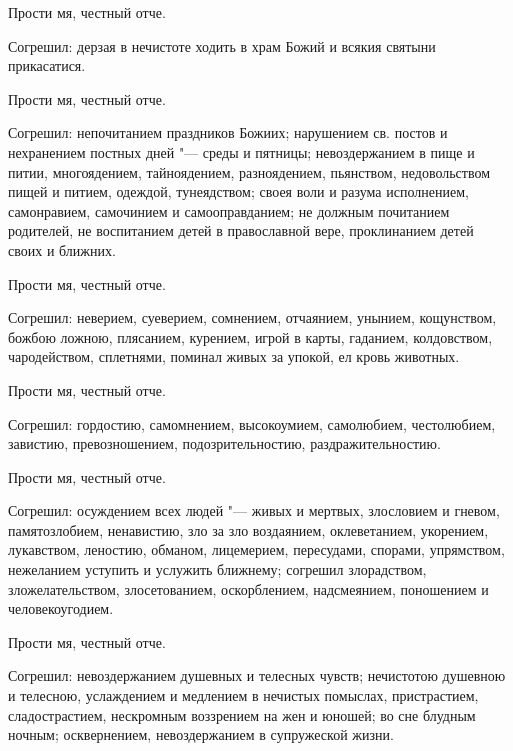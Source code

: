 Прости мя, честный отче. 



Согрешил: дерзая в нечистоте ходить в храм Божий и всякия святыни прикасатися. 



Прости мя, честный отче. 



Согрешил: непочитанием праздников Божиих; нарушением св. постов и нехранением постных дней "--- среды и пятницы; невоздержанием в пище и питии, многоядением, тайноядением, разноядением, пьянством, недовольством пищей и питием, одеждой, тунеядством; своея воли и разума исполнением, самонравием, самочинием и самооправданием; не должным почитанием родителей, не воспитанием детей в православной вере, проклинанием детей своих и ближних. 



Прости мя, честный отче. 



Согрешил: неверием, суеверием, сомнением, отчаянием, унынием, кощунством, божбою ложною, плясанием, курением, игрой в карты, гаданием, колдовством, чародейством, сплетнями, поминал живых за упокой, ел кровь животных. 



Прости мя, честный отче. 



Согрешил: гордостию, самомнением, высокоумием, самолюбием, честолюбием, завистию, превозношением, подозрительностию, раздражительностию. 



Прости мя, честный отче. 



Согрешил: осуждением всех людей "--- живых и мертвых, злословием и гневом, памятозлобием, ненавистию, зло за зло воздаянием, оклеветанием, укорением, лукавством, леностию, обманом, лицемерием, пересудами, спорами, упрямством, нежеланием уступить и услужить ближнему; согрешил злорадством, зложелательством, злосетованием, оскорблением, надсмеянием, поношением и человекоугодием. 



Прости мя, честный отче. 



Согрешил: невоздержанием душевных и телесных чувств; нечистотою душевною и телесною, услаждением и медлением в нечистых помыслах, пристрастием, сладострастием, нескромным воззрением на жен и юношей; во сне блудным ночным; осквернением, невоздержанием в супружеской жизни. 



